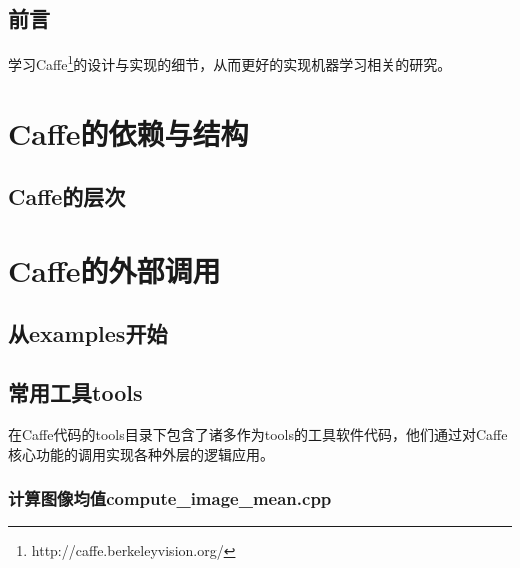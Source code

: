 \documentclass{../CNTeXBookTemplate/NanCNBook}
\title{\hei\chuhao{Caffe\cite{jia2014caffe}解析}}
\author{nannanmath}
\begin{document}
\maketitle{}
\thispagestyle{empty}

\frontmatter
\pagestyle{plain}
\chapter*{前{\quad}言}
学习Caffe\footnote{http://caffe.berkeleyvision.org/}的设计与实现的细节，从而更好的实现机器学习相关的研究。

\tableofcontents
\listoffigures
\listoftables

\mainmatter
\pagestyle{fancy}

\part{Caffe的依赖与结构}







\chapter{Caffe的层次}

\part{Caffe的外部调用}

\chapter{从examples开始} %


\chapter{常用工具tools}
在Caffe代码的tools目录下包含了诸多作为tools的工具软件代码，他们通过对Caffe核心功能的调用实现各种外层的逻辑应用。
\section{计算图像均值compute\_image\_mean.cpp}
\end{document}
